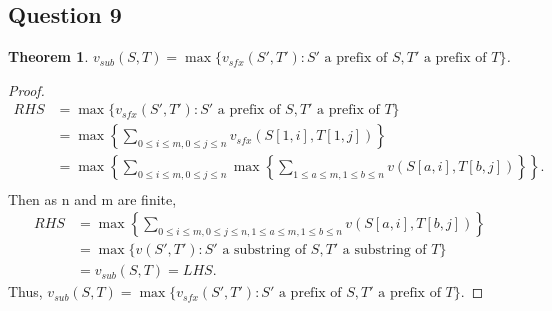 \documentclass{article}
\newtheorem{theorem}{Theorem}[section]
\begin{document}
\subsection{Question 9}
\vspace{-0.3cm}

\begin{theorem}
$v_{sub}(S,T)= \max \{ v_{sfx}(S',T'):S' \text{ a prefix of } S,T' \text{ a prefix of } T \}$.
\end{theorem}
\vspace{-0.7cm}
\begin{proof}
\begin{equation*}
\begin{split}
RHS &= \max \{ v_{sfx}(S',T'):S' \text{ a prefix of } S,T' \text{ a prefix of } T \} \\
&= \max \left \{ \sum_{0 \leq i \leq m, 0 \leq j \leq n} v_{sfx}(S[1,i],T[1,j]) \right \} \\
&= \max \left \{ \sum_{0 \leq i \leq m, 0 \leq j \leq n} \max \left \{ \sum_{1 \leq a \leq m,1 \leq b \leq n} v(S[a,i],T[b,j]) \right \} \right \}. \\
\end{split}
\end{equation*}
Then as n and m are finite,
\begin{equation*}
\begin{split}
RHS&= \max \left \{ \sum_{0 \leq i \leq m, 0 \leq j \leq n,1 \leq a \leq m,1 \leq b \leq n} v(S[a,i],T[b,j]) \right \} \\
&= \max \{ v(S',T'): S' \text{ a substring of } S, T' \text{ a substring of } T \} \\
&= v_{sub}(S,T) = LHS.
\end{split}
\end{equation*}
Thus, $v_{sub}(S,T)= \max \{ v_{sfx}(S',T'):S' \text{ a prefix of } S,T' \text{ a prefix of } T \}$.
\end{proof}
\vspace{-0.5cm}
\end{document}
